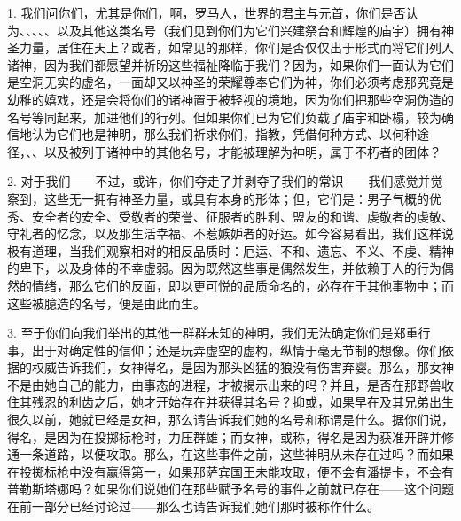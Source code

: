 1. 我们问你们，尤其是你们，啊，罗马人，世界的君主与元首，你们是否认为、、、、、以及其他这类名号（我们见到你们为它们兴建祭台和辉煌的庙宇）拥有神圣力量，居住在天上？或者，如常见的那样，你们是否仅仅出于形式而将它们列入诸神，因为我们都愿望并祈盼这些福祉降临于我们？因为，如果你们一面认为它们是空洞无实的虚名，一面却又以神圣的荣耀尊奉它们为神，你们必须考虑那究竟是幼稚的嬉戏，还是会将你们的诸神置于被轻视的境地，因为你们把那些空洞伪造的名号等同起来，加进他们的行列。但如果你们已为它们负载了庙宇和卧榻，较为确信地认为它们也是神明，那么我们祈求你们，指教，凭借何种方式、以何种途径，、、以及被列于诸神中的其他名号，才能被理解为神明，属于不朽者的团体？\par

2. 对于我们——不过，或许，你们夺走了并剥夺了我们的常识——我们感觉并觉察到，这些无一拥有神圣力量，或具有本身的形体；但，它们是：男子气概的优秀、安全者的安全、受敬者的荣誉、征服者的胜利、盟友的和谐、虔敬者的虔敬、守礼者的忆念，以及那生活幸福、不惹嫉妒者的好运。如今容易看出，我们这样说极有道理，当我们观察相对的相反品质时：厄运、不和、遗忘、不义、不虔、精神的卑下，以及身体的不幸虚弱。因为既然这些事是偶然发生，并依赖于人的行为偶然的情绪，那么它们的反面，即以更可悦的品质命名的，必存在于其他事物中；而这些被臆造的名号，便是由此而生。\par

3. 至于你们向我们举出的其他一群群未知的神明，我们无法确定你们是郑重行事，出于对确定性的信仰；还是玩弄虚空的虚构，纵情于毫无节制的想像。你们依据的权威告诉我们，女神得名，是因为那头凶猛的狼没有伤害弃婴。那么，那女神不是由她自己的能力，由事态的进程，才被揭示出来的吗？并且，是否在那野兽收住其残忍的利齿之后，她才开始存在并获得其名号？抑或，如果早在及其兄弟出生很久以前，她就已经是女神，那么请告诉我们她的名号和称谓是什么。据你们说，得名，是因为在投掷标枪时，力压群雄；而女神，或称，得名是因为获准开辟并修通一条道路，以便攻取。那么，在这些事件之前，这些神明从未存在过吗？而如果在投掷标枪中没有赢得第一，如果那萨宾国王未能攻取，便不会有潘提卡，不会有普勒斯塔娜吗？如果你们说她们在那些赋予名号的事件之前就已存在——这个问题在前一部分已经讨论过——那么也请告诉我们她们那时被称作什么。\par

